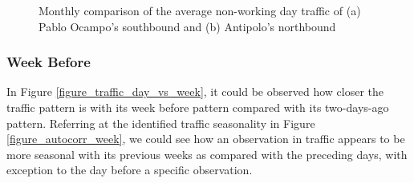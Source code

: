 \begin{figure}[h] 
\centering
    \centering
      \captionsetup{justification=centering}
    \hfill
    \caption{Monthly comparison of the average non-working day traffic of (a) Pablo Ocampo’s southbound and (b) Antipolo’s northbound }

    \label{figure_nonworkingday_peakhour}
\end{figure}


\subsubsection{Week Before}
In Figure \ref{figure_traffic_day_vs_week}, it could be observed how closer the traffic pattern is with its week before pattern compared with its two-days-ago pattern. Referring at the identified traffic seasonality in Figure \ref{figure_autocorr_week}, we could see how an observation in traffic appears to be more seasonal with its previous weeks as compared with the preceding days, with exception to the day before a specific observation.

